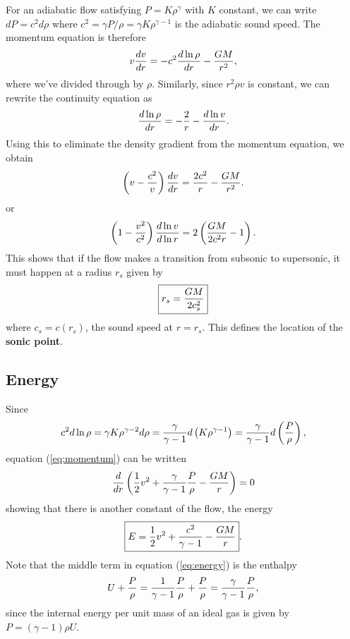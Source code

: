 \documentclass[preprint,12pt]{aastex}
\begin{document}
For an adiabatic flow satisfying $P=K\rho^\gamma$ with $K$ constant, we can write $dP = c^2 d\rho$ where $c^2 = \gamma P/\rho = \gamma K \rho^{\gamma-1}$ is the adiabatic sound speed. The momentum equation is therefore
\begin{equation}\label{eq:momentum}
v{dv\over dr} = -c^2{d\ln\rho\over dr}-{GM\over r^2},
\end{equation}
where we've divided through by $\rho$. Similarly, since $r^2\rho v$ is constant, we can rewrite the continuity equation as 
\begin{equation}
{d\ln\rho\over dr} = -{2\over r} -{d\ln v\over dr}.
\end{equation}
Using this to eliminate the density gradient from the momentum equation, we obtain
\begin{equation}
\left(v-{c^2\over v}\right){dv\over dr} = {2c^2\over r}-{GM\over r^2}.
\end{equation}
or
\begin{equation}
\left(1-{v^2\over c^2}\right){d\ln v\over d\ln r}=2\left({GM\over 2c^2r}-1\right).
\end{equation}
This shows that if the flow makes a transition from subsonic to supersonic, it must happen at a radius $r_s$ given by 
\begin{equation}
\boxed{
r_s = {GM\over 2c_s^2}
}
\end{equation}
where $c_s = c(r_s)$, the sound speed at $r=r_s$. This defines the location of the {\bf sonic point}.

\subsection{Energy}

Since
\begin{equation}
c^2d\ln\rho = \gamma K \rho^{\gamma-2}d\rho = {\gamma\over \gamma-1}d\left(K \rho^{\gamma-1} \right)={\gamma\over \gamma-1}d\left({P\over \rho} \right),
\end{equation}
equation (\ref{eq:momentum}) can be written
\begin{equation}\label{eq:energy}
{d\over dr}\left({1\over 2}v^2 + {\gamma \over \gamma-1}{P\over\rho} -{GM\over r}\right)=0
\end{equation}
showing that there is another constant of the flow, the energy
\begin{equation}
\boxed{
E = {1\over 2}v^2 + {c^2\over \gamma-1} -{GM\over r}
}
.
\end{equation}
Note that the middle term in equation (\ref{eq:energy}) is the enthalpy
\begin{equation}
U + {P\over \rho} = {1\over \gamma-1}{P\over\rho} + {P\over \rho} =  {\gamma \over \gamma-1}{P\over\rho},
\end{equation}
since the internal energy per unit mass of an ideal gas is given by $P = (\gamma - 1)\rho U$.
\end{document}
